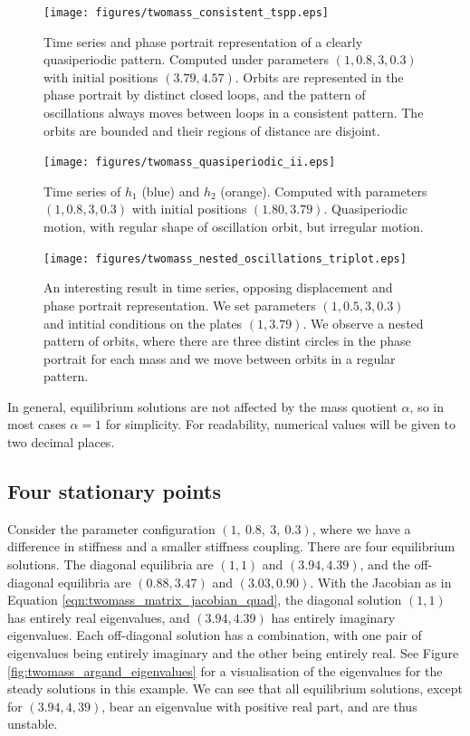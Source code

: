 \begin{figure}[h!]
    \centering
    \texttt{[image: figures/twomass\_consistent\_tspp.eps]}
    \caption{
        Time series and phase portrait representation of a clearly quasiperiodic pattern.
        Computed under parameters $(1,0.8,3,0.3)$ with initial positions $(3.79,4.57)$.
        Orbits are represented in the phase portrait by distinct closed loops,
        and the pattern of oscillations always moves between loops in a consistent pattern.
        The orbits are bounded and their regions of distance are disjoint.
    }
    \label{fig:twomass_nice_orbits_tspp}
\end{figure}

\begin{figure}[h!]
    \centering
    \texttt{[image: figures/twomass\_quasiperiodic\_ii.eps]}
    \caption{
        Time series of $h_1$ (blue) and $h_2$ (orange).
        Computed with parameters $(1, 0.8, 3, 0.3)$ with initial positions $(1.80,3.79).$
        Quasiperiodic motion, with regular shape of oscillation orbit,
        but irregular motion.
    }
    \label{fig:twomass_generic_quasi}
\end{figure}

\begin{figure}[h!]
    \centering
    \texttt{[image: figures/twomass\_nested\_oscillations\_triplot.eps]}
    \caption{
        An interesting result in time series, opposing displacement and phase portrait representation.
        We set parameters \((1,0.5,3,0.3)\) and intitial conditions on the plates \((1,3.79)\).
        We observe a nested pattern of orbits,
        where there are three distint circles in the phase portrait for each mass and we move between orbits in a regular pattern.
    }
    \label{fig:twomass_nested_interesting_1}
\end{figure}

In general, equilibrium solutions are not affected by the mass quotient $\alpha$, so in most cases $\alpha = 1$ for simplicity.
For readability, numerical values will be given to two decimal places.

\subsection{Four stationary points}

Consider the parameter configuration \((1,~0.8,~3,~0.3)\), where we have a difference in stiffness and a smaller stiffness coupling.
There are four equilibrium solutions.
The diagonal equilibria are \((1,1)\) and \((3.94,4.39)\),
and the off-diagonal equilibria are \((0.88,3.47)\) and \((3.03,0.90)\).
With the Jacobian as in Equation \ref{eqn:twomass_matrix_jacobian_quad},
the diagonal solution \((1,1)\) has entirely real eigenvalues, and \((3.94,4.39)\) has entirely imaginary eigenvalues.
Each off-diagonal solution has a combination, with one pair of eigenvalues being entirely imaginary and the other being entirely real.
See Figure \ref{fig:twomass_argand_eigenvalues} for a visualisation of the eigenvalues for the steady solutions in this example.
We can see that all equilibrium solutions, except for \((3.94,4,39)\), bear an eigenvalue with positive real part, and are thus unstable.  %

